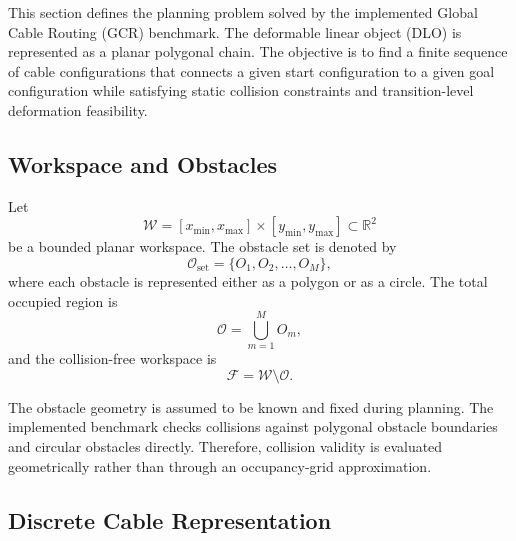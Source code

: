 \documentclass{pas}
\begin{document}
This section defines the planning problem solved by the implemented Global Cable Routing (GCR) benchmark. The deformable linear object (DLO) is represented as a planar polygonal chain. The objective is to find a finite sequence of cable configurations that connects a given start configuration to a given goal configuration while satisfying static collision constraints and transition-level deformation feasibility.

\subsection{Workspace and Obstacles}
\label{subsec:workspace_obstacles}

Let
\begin{equation}
\mathcal{W}
=
[x_{\min},x_{\max}]
\times
[y_{\min},y_{\max}]
\subset \mathbb{R}^{2}
\label{eq:workspace_rectangle}
\end{equation}
be a bounded planar workspace. The obstacle set is denoted by
\begin{equation}
\mathcal{O}_{\mathrm{set}}
=
\{O_1,O_2,\ldots,O_M\},
\label{eq:obstacle_set}
\end{equation}
where each obstacle is represented either as a polygon or as a circle. The total occupied region is
\begin{equation}
\mathcal{O}
=
\bigcup_{m=1}^{M} O_m ,
\label{eq:obstacle_union}
\end{equation}
and the collision-free workspace is
\begin{equation}
\mathcal{F}
=
\mathcal{W}\setminus \mathcal{O}.
\label{eq:workspace_free_region}
\end{equation}

The obstacle geometry is assumed to be known and fixed during planning. The implemented benchmark checks collisions against polygonal obstacle boundaries and circular obstacles directly. Therefore, collision validity is evaluated geometrically rather than through an occupancy-grid approximation.


\subsection{Discrete Cable Representation}
\label{subsec:dlo_representation}
\end{document}
